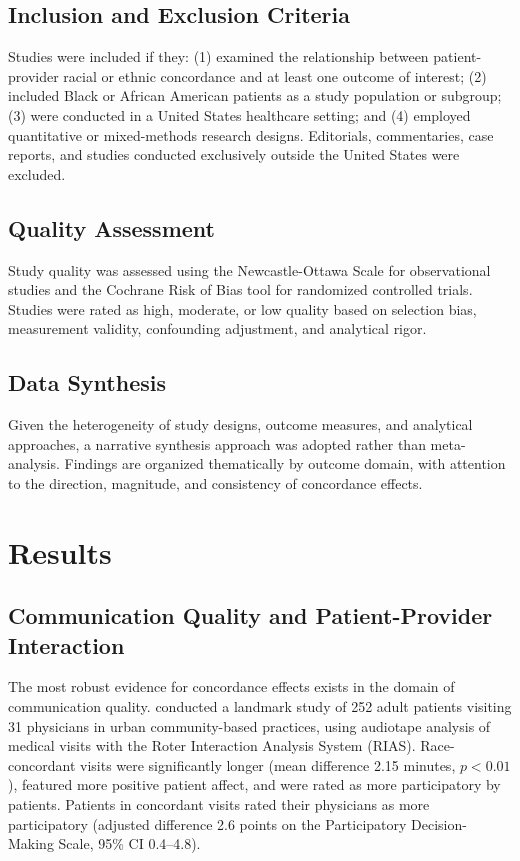 \documentclass[12pt]{article}
\begin{document}
\subsection{Inclusion and Exclusion Criteria}

Studies were included if they: (1) examined the relationship between patient-provider racial or ethnic concordance and at least one outcome of interest; (2) included Black or African American patients as a study population or subgroup; (3) were conducted in a United States healthcare setting; and (4) employed quantitative or mixed-methods research designs. Editorials, commentaries, case reports, and studies conducted exclusively outside the United States were excluded.

\subsection{Quality Assessment}

Study quality was assessed using the Newcastle-Ottawa Scale for observational studies and the Cochrane Risk of Bias tool for randomized controlled trials. Studies were rated as high, moderate, or low quality based on selection bias, measurement validity, confounding adjustment, and analytical rigor.

\subsection{Data Synthesis}

Given the heterogeneity of study designs, outcome measures, and analytical approaches, a narrative synthesis approach was adopted rather than meta-analysis. Findings are organized thematically by outcome domain, with attention to the direction, magnitude, and consistency of concordance effects.

\section{Results}

\subsection{Communication Quality and Patient-Provider Interaction}

The most robust evidence for concordance effects exists in the domain of communication quality. \citet{cooper2003} conducted a landmark study of 252 adult patients visiting 31 physicians in urban community-based practices, using audiotape analysis of medical visits with the Roter Interaction Analysis System (RIAS). Race-concordant visits were significantly longer (mean difference 2.15 minutes, $p < 0.01$), featured more positive patient affect, and were rated as more participatory by patients. Patients in concordant visits rated their physicians as more participatory (adjusted difference 2.6 points on the Participatory Decision-Making Scale, 95\% CI 0.4--4.8).
\end{document}
